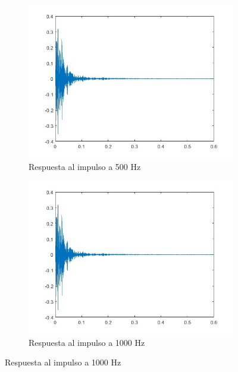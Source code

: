 \begin{figure}[!htb]
    \centering
     \begin{subfigure}{0.3\textwidth}
        \centering
        \includegraphics[width=\linewidth]{imagenes/RIR_500Hz_RIR_Measurement.jpg}
        \caption{\footnotesize Respuesta al impulso a 500 Hz}
        \label{fig:sub1}
    \end{subfigure}
    \hfill
    \begin{subfigure}{0.3\textwidth}
        \centering
        \includegraphics[width=\linewidth]{imagenes/RIR_1000Hz_RIR_Measurement.jpg}
        \caption{\footnotesize Respuesta al impulso a 1000 Hz}
        \label{fig:sub2}
    \end{subfigure}

\end{figure}
